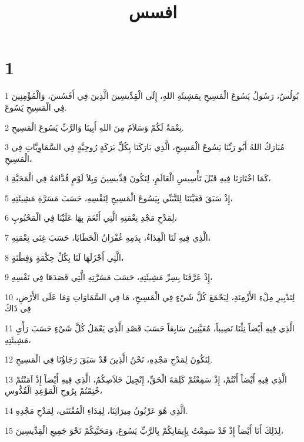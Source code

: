 

\title{افسس}


\chapter{1}

\par 1 بُولُسُ، رَسُولُ يَسُوعَ الْمَسِيحِ بِمَشِيئَةِ اللهِ، إِلَى الْقِدِّيسِينَ الَّذِينَ فِي أَفَسُسَ، وَالْمُؤْمِنِينَ فِي الْمَسِيحِ يَسُوعَ.
\par 2 نِعْمَةٌ لَكُمْ وَسَلاَمٌ مِنَ اللهِ أَبِينَا وَالرَّبِّ يَسُوعَ الْمَسِيحِ.
\par 3 مُبَارَكٌ اللهُ أَبُو رَبِّنَا يَسُوعَ الْمَسِيحِ، الَّذِي بَارَكَنَا بِكُلِّ بَرَكَةٍ رُوحِيَّةٍ فِي السَّمَاوِيَّاتِ فِي الْمَسِيحِ،
\par 4 كَمَا اخْتَارَنَا فِيهِ قَبْلَ تَأْسِيسِ الْعَالَمِ، لِنَكُونَ قِدِّيسِينَ وَبِلاَ لَوْمٍ قُدَّامَهُ فِي الْمَحَبَّةِ،
\par 5 إِذْ سَبَقَ فَعَيَّنَنَا لِلتَّبَنِّي بِيَسُوعَ الْمَسِيحِ لِنَفْسِهِ، حَسَبَ مَسَرَّةِ مَشِيئَتِهِ،
\par 6 لِمَدْحِ مَجْدِ نِعْمَتِهِ الَّتِي أَنْعَمَ بِهَا عَلَيْنَا فِي الْمَحْبُوبِ،
\par 7 الَّذِي فِيهِ لَنَا الْفِدَاءُ، بِدَمِهِ غُفْرَانُ الْخَطَايَا، حَسَبَ غِنَى نِعْمَتِهِ،
\par 8 الَّتِي أَجْزَلَهَا لَنَا بِكُلِّ حِكْمَةٍ وَفِطْنَةٍ،
\par 9 إِذْ عَرَّفَنَا بِسِرِّ مَشِيئَتِهِ، حَسَبَ مَسَرَّتِهِ الَّتِي قَصَدَهَا فِي نَفْسِهِ،
\par 10 لِتَدْبِيرِ مِلْءِ الأَزْمِنَةِ، لِيَجْمَعَ كُلَّ شَيْءٍ فِي الْمَسِيحِ، مَا فِي السَّمَاوَاتِ وَمَا عَلَى الأَرْضِ، فِي ذَاكَ
\par 11 الَّذِي فِيهِ أَيْضاً نِلْنَا نَصِيباً، مُعَيَّنِينَ سَابِقاً حَسَبَ قَصْدِ الَّذِي يَعْمَلُ كُلَّ شَيْءٍ حَسَبَ رَأْيِ مَشِيئَتِهِ،
\par 12 لِنَكُونَ لِمَدْحِ مَجْدِهِ، نَحْنُ الَّذِينَ قَدْ سَبَقَ رَجَاؤُنَا فِي الْمَسِيحِ.
\par 13 الَّذِي فِيهِ أَيْضاً أَنْتُمْ، إِذْ سَمِعْتُمْ كَلِمَةَ الْحَقِّ، إِنْجِيلَ خَلاَصِكُمُ، الَّذِي فِيهِ أَيْضاً إِذْ آمَنْتُمْ خُتِمْتُمْ بِرُوحِ الْمَوْعِدِ الْقُدُّوسِ،
\par 14 الَّذِي هُوَ عَرْبُونُ مِيرَاثِنَا، لِفِدَاءِ الْمُقْتَنَى، لِمَدْحِ مَجْدِهِ.
\par 15 لِذَلِكَ أَنَا أَيْضاً إِذْ قَدْ سَمِعْتُ بِإِيمَانِكُمْ بِالرَّبِّ يَسُوعَ، وَمَحَبَّتِكُمْ نَحْوَ جَمِيعِ الْقِدِّيسِينَ،
